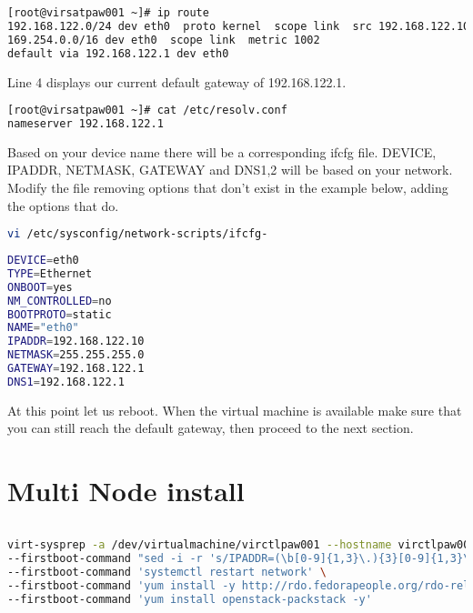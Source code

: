 \documentclass[11pt,letterpaper,oneside]{book}
\begin{document}
\begin{lstlisting}[caption={Current Default Route},language=bash]
[root@virsatpaw001 ~]# ip route
192.168.122.0/24 dev eth0  proto kernel  scope link  src 192.168.122.10
169.254.0.0/16 dev eth0  scope link  metric 1002 
default via 192.168.122.1 dev eth0 
\end{lstlisting}
Line 4 displays our current default gateway of 192.168.122.1.

\begin{lstlisting}[caption={Current Resolver},language=bash]
[root@virsatpaw001 ~]# cat /etc/resolv.conf
nameserver 192.168.122.1
\end{lstlisting}


Based on your device name there will be a corresponding ifcfg file.  DEVICE, IPADDR, NETMASK, GATEWAY and DNS1,2 will be based on your network.  Modify the file removing options that don't exist in the example below, adding the options that do.
\begin{lstlisting}[caption={Modify Ethernet interface from DHCP to static},language=bash]
vi /etc/sysconfig/network-scripts/ifcfg-
\end{lstlisting}

\begin{lstlisting}[caption={Example Ethernet configuration},language=bash]
DEVICE=eth0
TYPE=Ethernet
ONBOOT=yes
NM_CONTROLLED=no
BOOTPROTO=static
NAME="eth0"
IPADDR=192.168.122.10
NETMASK=255.255.255.0
GATEWAY=192.168.122.1
DNS1=192.168.122.1
\end{lstlisting}
At this point let us reboot.  When the virtual machine is available make sure that you can still reach the default gateway, then proceed to the next section.



\chapter{Multi Node install}

\begin{lstlisting}[caption={foo},language=bash]

\end{lstlisting}

\begin{lstlisting}[caption={foo},language=bash]
virt-sysprep -a /dev/virtualmachine/virctlpaw001 --hostname virctlpaw001.virtomation.com \
--firstboot-command "sed -i -r 's/IPADDR=(\b[0-9]{1,3}\.){3}[0-9]{1,3}\b'/IPADDR=10.53.252.61/ /etc/sysconfig/network-scripts/ifcfg-eth0" \
--firstboot-command 'systemctl restart network' \
--firstboot-command 'yum install -y http://rdo.fedorapeople.org/rdo-release.rpm' \
--firstboot-command 'yum install openstack-packstack -y' 
\end{lstlisting}
\end{document}
